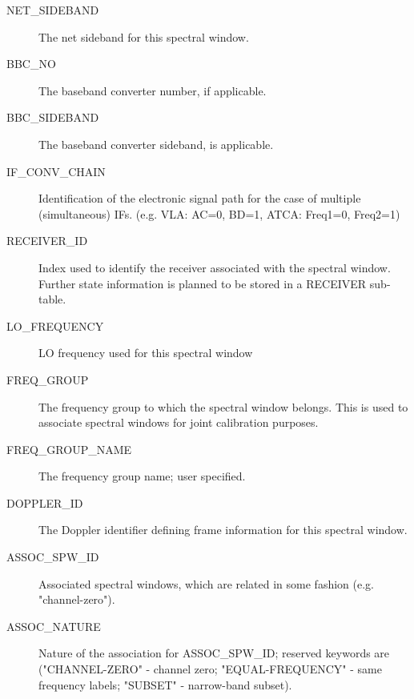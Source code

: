 \documentclass{article}
\begin{document}
\begin{description}
\item[NET\_SIDEBAND] The net sideband for this spectral window.

\item[BBC\_NO] The baseband converter number, if applicable.

\item[BBC\_SIDEBAND] The baseband converter sideband, is applicable.

\item[IF\_CONV\_CHAIN] Identification of the electronic signal
path for the case of multiple (simultaneous) IFs. (e.g. VLA: AC=0,
BD=1, ATCA: Freq1=0, Freq2=1)

\item[RECEIVER\_ID] Index used to identify the receiver associated
with the spectral window. Further state information is planned to be
stored in a RECEIVER sub-table.

\item[LO\_FREQUENCY] LO frequency used for this spectral window

\item[FREQ\_GROUP] The frequency group to which the spectral window belongs.
This is used to associate spectral windows for joint calibration purposes.

\item[FREQ\_GROUP\_NAME] The frequency group name; user specified.

\item[DOPPLER\_ID] The Doppler identifier defining frame information
for this spectral window.

\item[ASSOC\_SPW\_ID] Associated spectral windows, which are related
in some fashion (e.g. "channel-zero").

\item[ASSOC\_NATURE] Nature of the association for ASSOC\_SPW\_ID;
reserved keywords are ("CHANNEL-ZERO" - channel zero;
"EQUAL-FREQUENCY" - same frequency labels; "SUBSET" - narrow-band
subset).

\end{description}
\end{document}
